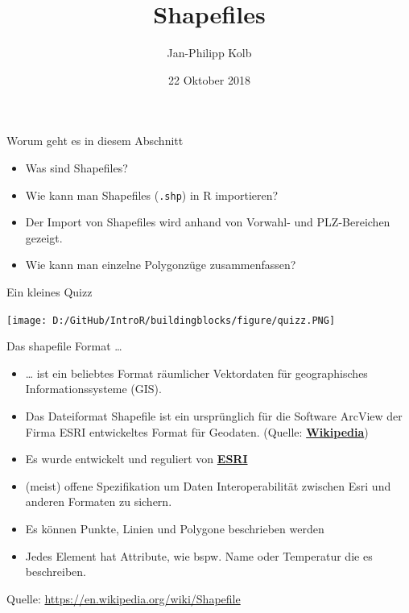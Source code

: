 \documentclass[ignorenonframetext,]{beamer}
\title{Shapefiles}
\author{Jan-Philipp Kolb}
\date{22 Oktober 2018}
\providecommand{\tightlist}{%
  \setlength{\itemsep}{0pt}\setlength{\parskip}{0pt}}
\begin{document}
\frame{\titlepage}

\begin{frame}[fragile]{Worum geht es in diesem Abschnitt}
\protect\hypertarget{worum-geht-es-in-diesem-abschnitt}{}

\begin{itemize}
\tightlist
\item
  Was sind Shapefiles?
\item
  Wie kann man Shapefiles (\texttt{.shp}) in R importieren?
\item
  Der Import von Shapefiles wird anhand von Vorwahl- und PLZ-Bereichen
  gezeigt.
\item
  Wie kann man einzelne Polygonzüge zusammenfassen?
\end{itemize}

\end{frame}

\begin{frame}{Ein kleines Quizz}
\protect\hypertarget{ein-kleines-quizz}{}

\texttt{[image: D:/GitHub/IntroR/buildingblocks/figure/quizz.PNG]}

\end{frame}

\begin{frame}{Das shapefile Format \ldots{}}
\protect\hypertarget{das-shapefile-format}{}

\begin{itemize}
\item
  \ldots{} ist ein beliebtes Format räumlicher Vektordaten für
  geographisches Informationssysteme (GIS).
\item
  Das Dateiformat Shapefile ist ein ursprünglich für die Software
  ArcView der Firma ESRI entwickeltes Format für Geodaten. (Quelle:
  \href{https://de.wikipedia.org/wiki/Shapefile}{\textbf{Wikipedia}})
\item
  Es wurde entwickelt und reguliert von
  \href{http://www.esri.com/}{\textbf{ESRI}}
\item
  (meist) offene Spezifikation um Daten Interoperabilität zwischen Esri
  und anderen Formaten zu sichern.
\item
  Es können Punkte, Linien und Polygone beschrieben werden
\item
  Jedes Element hat Attribute, wie bspw. Name oder Temperatur die es
  beschreiben.
\end{itemize}

Quelle: \url{https://en.wikipedia.org/wiki/Shapefile}

\end{frame}
\end{document}
